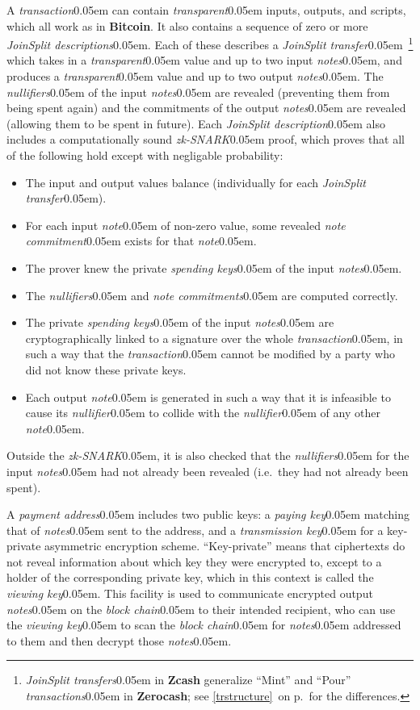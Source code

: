 \documentclass{article}
\renewcommand{\emph}[1]{\hspace{0.15em}{\fontfamily{pnc}\selectfont\scalebox{1.02}[0.999]{\textit{#1}}}\hspace{0.02em}}
\newcommand{\crossref}[1]{\autoref{#1}\, \emph{`\nameref*{#1}\kern -0.05em'} on p.\,\pageref*{#1}}
\newcommand{\hairspace}{~\!}
\newcommand{\term}[1]{\textsl{#1}\kern 0.05em\xspace}
\newcommand{\termbf}[1]{\textbf{#1}\xspace}
\newcommand{\Zcash}{\termbf{Zcash}}
\newcommand{\Zerocash}{\termbf{Zerocash}}
\newcommand{\Bitcoin}{\termbf{Bitcoin}}
\newcommand{\note}{\term{note}}
\newcommand{\notes}{\term{notes}}
\newcommand{\noteCommitment}{\term{note commitment}}
\newcommand{\noteCommitments}{\term{note commitments}}
\newcommand{\joinSplitDescription}{\term{JoinSplit description}}
\newcommand{\joinSplitDescriptions}{\term{JoinSplit descriptions}}
\newcommand{\joinSplitTransfer}{\term{JoinSplit transfer}}
\newcommand{\joinSplitTransfers}{\term{JoinSplit transfers}}
\newcommand{\transaction}{\term{transaction}}
\newcommand{\transactions}{\term{transactions}}
\newcommand{\transparent}{\term{transparent}}
\newcommand{\blockchain}{\term{block chain}}
\newcommand{\nullifier}{\term{nullifier}}
\newcommand{\nullifiers}{\term{nullifiers}}
\newcommand{\paymentAddress}{\term{payment address}}
\newcommand{\viewingKey}{\term{viewing key}}
\newcommand{\spendingKeys}{\term{spending keys}}
\newcommand{\payingKey}{\term{paying key}}
\newcommand{\transmissionKey}{\term{transmission key}}
\newcommand{\zkSNARK}{\term{zk-SNARK}}
\begin{document}
A \transaction can contain \transparent inputs, outputs, and scripts,
which all work as in \Bitcoin. It also contains a sequence of zero or
more \joinSplitDescriptions. Each of these describes a \joinSplitTransfer\hairspace\footnote{
\joinSplitTransfers in \Zcash generalize ``Mint'' and ``Pour'' \transactions
in \Zerocash; see \crossref{trstructure} for the differences.}
which takes in a \transparent value and up to two input \notes, and produces a
\transparent value and up to two output \notes. The \nullifiers of the input
\notes are revealed (preventing them from being spent again) and the
commitments of the output \notes are revealed (allowing them to be spent in
future). Each \joinSplitDescription also includes a computationally sound
\zkSNARK proof, which proves that all of the following hold except with
negligable probability:

\begin{itemize}
  \item The input and output values balance (individually for each \joinSplitTransfer).
  \item For each input \note of non-zero value, some revealed \noteCommitment
        exists for that \note.
  \item The prover knew the private \spendingKeys of the input \notes.
  \item The \nullifiers and \noteCommitments are computed correctly.
  \item The private \spendingKeys of the input \notes are cryptographically
        linked to a signature over the whole \transaction, in such a way that
        the \transaction cannot be modified by a party who did not know these
        private keys.
  \item Each output \note is generated in such a way that it is infeasible to
        cause its \nullifier to collide with the \nullifier of any other \note.
\end{itemize}

Outside the \zkSNARK, it is also checked that the \nullifiers for the input
\notes had not already been revealed (i.e.\ they had not already been spent).

A \paymentAddress includes two public keys: a \payingKey matching that of \notes
sent to the address, and a \transmissionKey for a key-private asymmetric encryption
scheme. ``Key-private'' means that ciphertexts do not reveal information about
which key they were encrypted to, except to a holder of the corresponding
private key, which in this context is called the \viewingKey. This facility is
used to communicate encrypted output \notes on the \blockchain to their
intended recipient, who can use the \viewingKey to scan the \blockchain for
\notes addressed to them and then decrypt those \notes.
\end{document}
